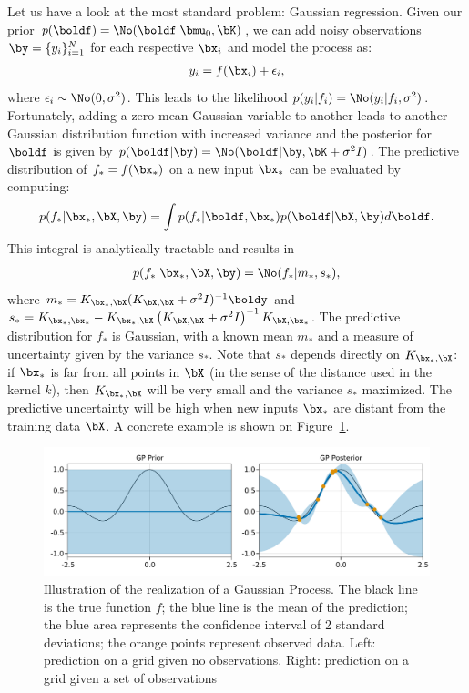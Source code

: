 Let us have a look at the most standard problem: Gaussian regression.
Given our prior $p(\boldf) = \No(\boldf|\bmu_0, \bK)$, we can add noisy observations $\by = \{y_i\}_{i=1}^N$ for each respective $\bx_i$ and model the process as:
\begin{align}
y_i = f(\bx_i) + \epsilon_i,
\end{align}
where $\epsilon_i \sim \No(0,\sigma^2)$.
This leads to the likelihood $p(y_i|f_i) = \No(y_i|f_i, \sigma^2)$.
Fortunately, adding a zero-mean Gaussian variable to another leads to another Gaussian distribution function with increased variance and the posterior for $\boldf$ is given by $p(\boldf|\by) = \No(\boldf|\by, \bK + \sigma^2 I)$.
The predictive distribution of $f_*=f(\bx_*)$ on a new input $\bx_*$ can be evaluated by computing:
\begin{align}
p(f_*|\bx_*,\bX,\by) = \int p(f_*|\boldf,\bx_*)p(\boldf|\bX,\by)d\boldf.
\end{align}	
This integral is analytically tractable and results in 
\begin{align}
    p(f_*|\bx_*,\bX,\by)=\No(f_*|m_*,s_*),
    \label{eq:pred_gp}
\end{align}
where $m_* = K_{\bx_*,\bX}(K_{\bX,\bX} + \sigma^{2}I)^{-1}\boldy$ and $s_*=K_{\bx_*,\bx_*} - K_{\bx_*,\bX}\left(K_{\bX,\bX}+\sigma^2I\right)^{-1}K_{\bX,\bx_*}$.
The predictive distribution for $f_*$ is Gaussian, with a known mean $m_*$ and a measure of uncertainty given by the variance $s_*$.
Note that $s_*$ depends directly on $K_{\bx_*,\bX}$: if $\bx_*$ is far from all points in $\bX$ (in the sense of the distance used in the kernel $k$), then $K_{\bx_*,\bX}$ will be very small and the variance $s_*$ maximized.
The predictive uncertainty will be high when new inputs $\bx_*$ are distant from the training data $\bX$.
A concrete example is shown on Figure~\ref{fig:gp_example}.

\begin{figure}
    \includegraphics[width=\textwidth]{./chapters/2_background/figures/GP_example.pdf}
    \caption{Illustration of the realization of a Gaussian Process. The black line is the true function $f$; the blue line is the mean of the prediction; the blue area represents the confidence interval of 2 standard deviations; the orange points represent observed data. Left: prediction on a grid given no observations. Right: prediction on a grid given a set of observations}
    \label{fig:gp_example}
\end{figure}

